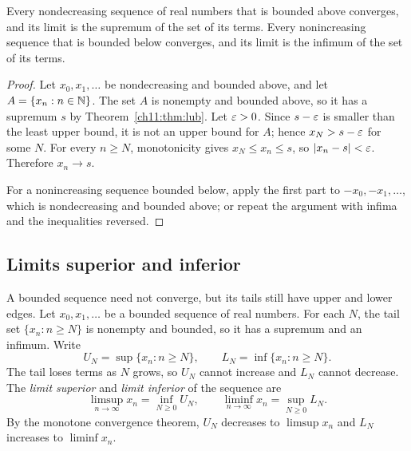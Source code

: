 \par\noindent\begin{minipage}{\linewidth}
\begin{theorem}\label{ch11:thm:monotone}
Every nondecreasing sequence of real numbers that is bounded above converges, and its limit is the supremum of the set of its terms. Every nonincreasing sequence that is bounded below converges, and its limit is the infimum of the set of its terms.
\end{theorem}
\end{minipage}\par

\begin{proof}
Let $x_0,x_1,\ldots$ be nondecreasing and bounded above, and let $A=\{x_n:n\in\mathbb N\}$. The set $A$ is nonempty and bounded above, so it has a supremum $s$ by Theorem~\ref{ch11:thm:lub}. Let $\varepsilon>0$. Since $s-\varepsilon$ is smaller than the least upper bound, it is not an upper bound for $A$; hence $x_N>s-\varepsilon$ for some $N$. For every $n\ge N$, monotonicity gives $x_N\le x_n\le s$, so $|x_n-s|<\varepsilon$. Therefore $x_n\to s$.

For a nonincreasing sequence bounded below, apply the first part to $-x_0,-x_1,\ldots$, which is nondecreasing and bounded above; or repeat the argument with infima and the inequalities reversed.
\end{proof}


\subsection*{Limits superior and inferior}
A bounded sequence need not converge, but its tails still have upper and lower edges. Let $x_0,x_1,\ldots$ be a bounded sequence of real numbers. For each $N$, the tail set $\{x_n:n\ge N\}$ is nonempty and bounded, so it has a supremum and an infimum. Write
\[
U_N=\sup\{x_n:n\ge N\},\qquad L_N=\inf\{x_n:n\ge N\}.
\]
The tail loses terms as $N$ grows, so $U_N$ cannot increase and $L_N$ cannot decrease. The \emph{limit superior} and \emph{limit inferior} of the sequence are
\[
\limsup_{n\to\infty}x_n=\inf_{N\ge0}U_N,\qquad
\liminf_{n\to\infty}x_n=\sup_{N\ge0}L_N.
\]
By the monotone convergence theorem, $U_N$ decreases to $\limsup x_n$ and $L_N$ increases to $\liminf x_n$.

